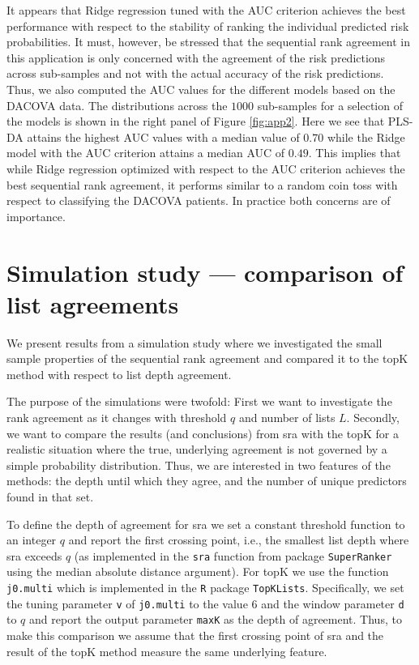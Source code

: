 \documentclass[oupdraft]{bio}
\newcommand{\added}[1]{{\color{added}{}#1}}
\begin{document}
It appears that Ridge regression tuned with the AUC criterion achieves
the best performance with respect to the stability of ranking the
individual predicted risk probabilities. It must, however, be stressed
that the sequential rank agreement in this application is only
concerned with the agreement of the risk predictions across
sub-samples and not with the actual accuracy of the risk
predictions. Thus, we also computed the AUC values for the different models
based on the DACOVA data. The distributions across the $1000$
sub-samples for a selection of the models is shown in the right panel
of Figure \ref{fig:app2}.  Here we see that PLS-DA attains the highest
AUC values with a median value of $0.70$ while the Ridge model with
the AUC criterion attains a median AUC of $0.49$. This implies that
while Ridge regression optimized with respect to the AUC criterion
achieves the best sequential rank agreement, it performs similar to a
random coin toss with respect to classifying the DACOVA patients.
In practice both concerns are of importance.


\section{Simulation study --- comparison of list agreements}

We present results from a simulation study where we investigated the
small sample properties of the sequential rank agreement and compared
it to the topK method \citep{hall:schi:2012} with respect to list
depth agreement.

\added{The purpose of the simulations were twofold: First we want to
  investigate the rank agreement as it changes with threshold $q$ and
  number of lists $L$. Secondly, we want to compare the results (and
  conclusions) from sra with the topK for a realistic situation where
  the true, underlying agreement is not governed by a simple
  probability distribution. Thus, we are interested in two features of
  the methods: the depth until which they agree, and the number of
  unique predictors found in that set.

  To define the depth of agreement for sra we set a constant threshold
  function to an integer $q$ and report the first crossing point,
  i.e., the smallest list depth where sra exceeds $q$ (as implemented
  in the \texttt{sra} function from package \texttt{SuperRanker} using
  the median absolute distance argument). For topK we use the function
  \texttt{j0.multi} which is implemented in the \texttt{R} package
  \texttt{TopKLists}. Specifically, we set the tuning parameter
  \texttt{v} of \texttt{j0.multi} to the value 6 and the window
  parameter \texttt{d} to $q$ and report the output parameter
  \texttt{maxK} as the depth of agreement. Thus, to make this
  comparison we assume that the first crossing point of sra and the
  result of the topK method measure the same underlying feature. }
\end{document}
